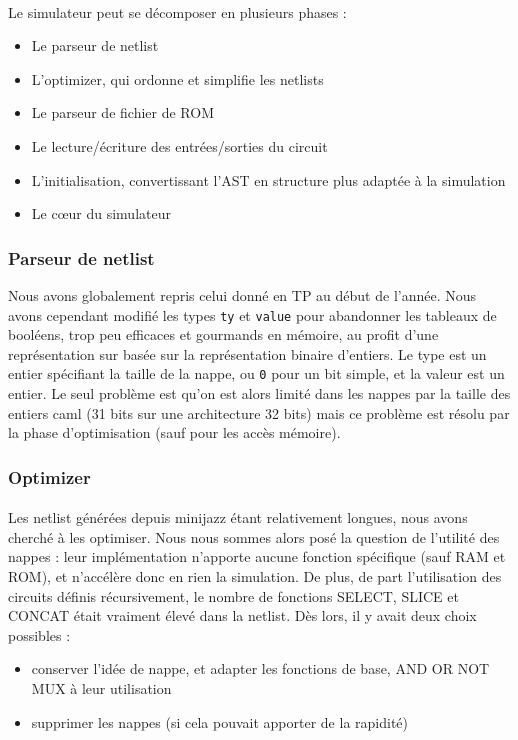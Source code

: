 \documentclass{article}
\begin{document}
\paragraph{}Le simulateur peut se décomposer en plusieurs phases :
\begin{itemize}
	\item Le parseur de netlist
	\item L'optimizer, qui ordonne et simplifie les netlists
	\item Le parseur de fichier de ROM
	\item Le lecture/écriture des entrées/sorties du circuit
	\item L'initialisation, convertissant l'AST en structure plus adaptée à la simulation
	\item Le cœur du simulateur
\end{itemize}

\subsubsection{Parseur de netlist}
Nous avons globalement repris celui donné en TP au début de l'année. Nous avons cependant modifié les types \texttt{ty} et \texttt{value} pour abandonner les tableaux de booléens, trop peu efficaces et gourmands en mémoire, au profit d'une représentation sur basée sur la représentation binaire d'entiers. Le type est un entier spécifiant la taille de la nappe, ou \texttt0 pour un bit simple, et la valeur est un entier. Le seul problème est qu'on est alors limité dans les nappes par la taille des entiers caml (31 bits sur une architecture 32 bits) mais ce problème est résolu par la phase d'optimisation (sauf pour les accès mémoire).

\subsubsection{Optimizer}
\paragraph{}Les netlist générées depuis minijazz étant relativement longues, nous avons cherché à les optimiser. Nous nous sommes alors posé la question de l'utilité des nappes : leur  implémentation n'apporte aucune fonction spécifique (sauf RAM et ROM),  et n'accélère donc en rien la simulation.
De  plus, de part l'utilisation des circuits définis récursivement, le  nombre de fonctions SELECT, SLICE et CONCAT était vraiment élevé dans la netlist.
Dès lors, il y avait deux choix possibles :
\begin{itemize}
	\item conserver l'idée de nappe, et adapter les fonctions de base, AND OR NOT MUX à leur utilisation
	\item supprimer les nappes (si cela pouvait apporter de la rapidité)
\end{itemize}
\end{document}
